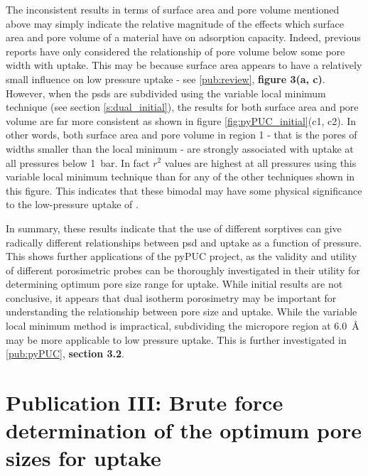 The inconsistent results in terms of surface area and pore volume mentioned above may simply indicate the relative magnitude of the effects which surface area and pore volume of a material have on \gls{adsorption} capacity. Indeed, previous reports have only considered the relationship of pore volume below some pore width with  uptake.\citep{Presser2011Effect, Sevilla2013Assessment, Adeniran2016Is, Wickramaratne2013Importance} This may be because surface area appears to have a relatively small influence on low pressure  uptake\citep{Sevilla2021More, Ludwinowicz2015Effect, Singh2019CO2, GrauMarin2020Evaluation} - see \ref{pub:review}, \textbf{figure 3(a, c)}. However, when the \glspl{psd} are subdivided using the variable local minimum technique (see section \ref{s:dual_initial}), the results for both surface area and pore volume are far more consistent as shown in figure \ref{fig:pyPUC_initial}(c1, c2). In other words, both surface area and pore volume in region 1 - that is the pores of widths smaller than the local minimum - are strongly associated with  uptake at all pressures below \qty{1}{\bar}. In fact $r^2$ values are highest at all pressures using this variable local minimum technique than for any of the other techniques shown in this figure. This indicates that these bimodal  may have some physical significance to the low-pressure uptake of .

In summary, these results indicate that the use of different sorptives can give radically different relationships between \gls{psd} and  uptake as a function of pressure. This shows further applications of the pyPUC project, as the validity and utility of different porosimetric probes can be thoroughly investigated in their utility for determining optimum pore size range for  uptake. While initial results are not conclusive, it appears that dual isotherm porosimetry may be important for understanding the relationship between pore size and  uptake. While the variable local minimum method is impractical, subdividing the \gls{micropore} region at \qty{6.0}{\angstrom} may be more applicable to low pressure  uptake. This is further investigated in \ref{pub:pyPUC}, \textbf{section 3.2}.

\newpage
\section[Publication III]{\texorpdfstring{Publication III: Brute force determination of the optimum pore sizes for
 uptake}{Publication III: Brute force determination of the optimum pore sizes for
CO2 uptake}}

